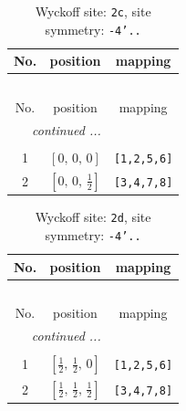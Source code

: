 \documentclass[fleqn,8pt]{jsarticle}
\begin{document}
\renewcommand{\arraystretch}{1.2}
\begin{longtable}{ccc}
\caption{Wyckoff site: {\tt 2c}, site symmetry: {\tt -4'..}}
 \\
 \hline \hline
No. & position & mapping \\ \hline \endfirsthead

\multicolumn{2}{l}{\tablename\ \thetable{}} \\
 \hline \hline
No. & position & mapping \\ \hline \endhead

 \hline \hline
\multicolumn{2}{r}{\footnotesize\it continued ...} \\ \endfoot

 \hline \hline
\multicolumn{2}{r}{} \\ \endlastfoot

1 & $\left[ 0,\, 0,\, 0 \right]$ & {\tt [1,2,5,6]} \\ \hline
2 & $\left[ 0,\, 0,\, \frac{1}{2} \right]$ & {\tt [3,4,7,8]} \\
\end{longtable}
\renewcommand{\arraystretch}{1.2}
\begin{longtable}{ccc}
\caption{Wyckoff site: {\tt 2d}, site symmetry: {\tt -4'..}}
 \\
 \hline \hline
No. & position & mapping \\ \hline \endfirsthead

\multicolumn{2}{l}{\tablename\ \thetable{}} \\
 \hline \hline
No. & position & mapping \\ \hline \endhead

 \hline \hline
\multicolumn{2}{r}{\footnotesize\it continued ...} \\ \endfoot

 \hline \hline
\multicolumn{2}{r}{} \\ \endlastfoot

1 & $\left[ \frac{1}{2},\, \frac{1}{2},\, 0 \right]$ & {\tt [1,2,5,6]} \\ \hline
2 & $\left[ \frac{1}{2},\, \frac{1}{2},\, \frac{1}{2} \right]$ & {\tt [3,4,7,8]} \\
\end{longtable}
\renewcommand{\arraystretch}{1.2}
\end{document}
